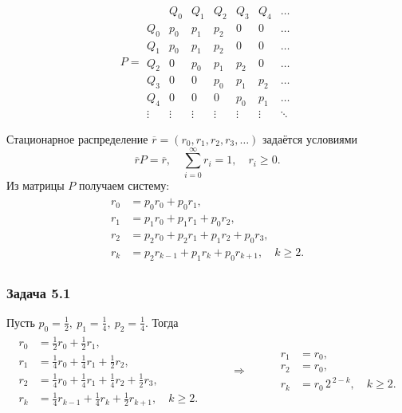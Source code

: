 \[
	P =
	\begin{array}{c|cccccc}
		       & Q_0    & Q_1    & Q_2    & Q_3    & Q_4    & \ldots \\ \hline
		Q_0    & p_0    & p_1    & p_2    & 0      & 0      & \ldots \\
		Q_1    & p_0    & p_1    & p_2    & 0      & 0      & \ldots \\
		Q_2    & 0      & p_0    & p_1    & p_2    & 0      & \ldots \\
		Q_3    & 0      & 0      & p_0    & p_1    & p_2    & \ldots \\
		Q_4    & 0      & 0      & 0      & p_0    & p_1    & \ldots \\
		\vdots & \vdots & \vdots & \vdots & \vdots & \vdots & \ddots
	\end{array}
\]

Стационарное распределение $\overline r=(r_0,r_1,r_2,r_3,\ldots)$ задаётся условиями
\[
	\overline r P = \overline r,\quad \sum_{i=0}^\infty r_i = 1,\quad r_i\ge0.
\]
Из матрицы $P$ получаем систему:
\[
	\begin{array}{rcl}
		\begin{aligned}
			r_0 & = p_0 r_0 + p_0 r_1,                                 \\
			r_1 & = p_1 r_0 + p_1 r_1 + p_0 r_2,                       \\
			r_2 & = p_2 r_0 + p_2 r_1 + p_1 r_2 + p_0 r_3,             \\
			r_k & = p_2 r_{k-1} + p_1 r_k + p_0 r_{k+1}, \quad k\ge 2.
		\end{aligned}
	\end{array}
\]

\subsubsection*{Задача 5.1}

Пусть $p_0=\tfrac{1}{2},\ p_1=\tfrac{1}{4},\ p_2=\tfrac{1}{4}$. Тогда
\[
	\begin{array}{rcl}
		\begin{aligned}
			r_0 & = \tfrac{1}{2} r_0 + \tfrac{1}{2} r_1,                                           \\
			r_1 & = \tfrac{1}{4} r_0 + \tfrac{1}{4} r_1 + \tfrac{1}{2} r_2,                        \\
			r_2 & = \tfrac{1}{4} r_0 + \tfrac{1}{4} r_1 + \tfrac{1}{4} r_2 + \tfrac{1}{2} r_3,     \\
			r_k & = \tfrac{1}{4} r_{k-1} + \tfrac{1}{4} r_k + \tfrac{1}{2} r_{k+1}, \quad k \ge 2.
		\end{aligned}
		 & \qquad \Rightarrow \qquad &
		\begin{aligned}
			r_1 & = r_0,                         \\
			r_2 & = r_0,                         \\
			r_k & = r_0\,2^{\,2-k},\quad k\ge 2.
		\end{aligned}
	\end{array}
\]

